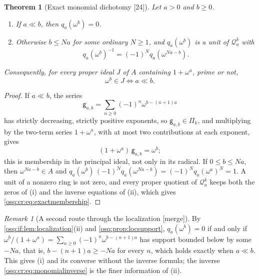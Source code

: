 \documentclass[11pt,letterpaper]{article}
\numberwithin{equation}{section}
\newtheorem{theorem}{Theorem}[section]
\theoremstyle{definition}
\theoremstyle{remark}
\newtheorem{remark}[remark]{Remark}
\theoremstyle{plain}
\newcommand{\Qa}{\mathcal Q}         %
\newcommand{\src}[1]{\textup{\textsf{[#1]}}}
\newcommand{\merge}{\textup{\textsf{[merge]}}}
\begin{document}
\begin{theorem}[Exact monomial dichotomy \src{24}]\label{osq:cr:thm:cutoff}
Let $a>0$ and $b\ge0$.
\begin{enumerate}
\item If $a\ll b$, then $q_a(\omega^b)=0$.
\item Otherwise $b\le Na$ for some ordinary $N\ge1$, and $q_a(\omega^b)$ is a unit of $\Qa^k_a$ with
\begin{equation}\label{osq:cr:eq:monomialinverse}
 q_a(\omega^b)^{-1}=(-1)^Nq_a(\omega^{Na-b}).
\end{equation}
\end{enumerate}
Consequently, for every proper ideal $J$ of $A$ containing $1+\omega^a$, prime or not,
\begin{equation}\label{osq:cr:eq:exactmembership}
 \omega^b\in J\iff a\ll b .
\end{equation}
\end{theorem}
\begin{proof}
If $a\ll b$, the series
\begin{equation}\label{osq:cr:eq:g}
 \mathsf g_{a,b}=\sum_{n\ge0}(-1)^n\omega^{b-(n+1)a}
\end{equation}
has strictly decreasing, strictly positive exponents, so $\mathsf g_{a,b}\in\Pi_k$, and multiplying by the two-term series $1+\omega^a$, with at most two
contributions at each exponent, gives
\begin{equation}\label{osq:cr:eq:telescope}
 (1+\omega^a)\,\mathsf g_{a,b}=\omega^b ;
\end{equation}
this is membership in the principal ideal, not only in its radical. If $0\le b\le Na$, then $\omega^{Na-b}\in A$ and
$q_a(\omega^b)\,(-1)^Nq_a(\omega^{Na-b})=(-1)^Nq_a(\omega^a)^N=1$. A unit of a nonzero ring is not zero, and every proper quotient of $\Qa^k_a$ keeps
both the zeros of (i) and the inverse equations of (ii), which gives \eqref{osq:cr:eq:exactmembership}.
\end{proof}

\begin{remark}[A second route through the localization \merge]\label{osq:cr:rem:cutofflocal}
By \cref{osq:if:lem:localization}(ii) and \cref{osq:prop:locsupport}, $q_a(\omega^b)=0$ if and only if $\omega^b/(1+\omega^a)=\sum_{n\ge0}(-1)^n
\omega^{b-(n+1)a}$ has support bounded below by some $-Na$, that is, $b-(n+1)a\ge-Na$ for every $n$, which holds exactly when $a\ll b$. This gives
(i) and its converse without the inverse formula; the inverse \eqref{osq:cr:eq:monomialinverse} is the finer information of (ii).
\end{remark}
\end{document}
